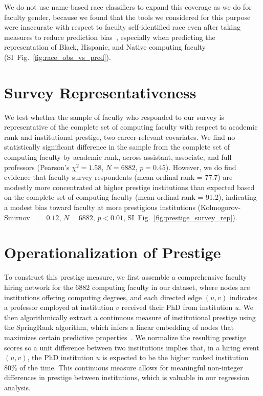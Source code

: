 \documentclass[reprint, twocolumn, aps, nofootinbib, superscriptaddress, longbibliography]{revtex4-1}
\begin{document}
We do not use name-based race classifiers to expand this coverage as we do for faculty gender, because we found that the tools we considered for this purpose were inaccurate with respect to faculty self-identified race even after taking measures to reduce prediction bias~\cite{kozlowski2021avoiding}, especially when predicting the representation of Black, Hispanic, and Native computing faculty (SI~Fig.~\ref{fig:race_obs_vs_pred}). 


\section{Survey Representativeness}\label{sec:survey_representativeness} 
We test whether the sample of faculty who responded to our survey is representative of the complete set of computing faculty with respect to academic rank and institutional prestige, two career-relevant covariates. We find no statistically significant difference in the sample from the complete set of computing faculty by academic rank, across assistant, associate, and full professors (Pearson’s $\chi^2 = 1.58$, $N = 6882$, $p = 0.45$). However, we do find evidence that faculty survey respondents (mean ordinal rank = 77.7) are modestly more concentrated at higher prestige institutions than expected based on the complete set of computing faculty (mean ordinal rank = 91.2), indicating a modest bias toward faculty at more prestigious institutions (Kolmogorov-Smirnov~$~=~0.12$, $N = 6882$, $p < 0.01$, SI~Fig.~\ref{fig:prestige_survey_rep}). 


\section{Operationalization of Prestige}\label{sec:si_prestige} 
To construct this prestige measure, we first assemble a comprehensive faculty hiring network for the 6882 computing faculty in our dataset, where nodes are institutions offering computing degrees, and each directed edge $(u,v)$ indicates a professor employed at institution $v$ received their PhD from institution $u$. We then algorithmically extract a continuous measure of institutional prestige using the SpringRank algorithm, which infers a linear embedding of nodes that maximizes certain predictive properties~\cite{de2018physical}. We normalize the resulting prestige scores so a unit difference between two institutions implies that, in a hiring event $(u,v)$, the PhD institution $u$ is expected to be the higher ranked institution 80\% of the time. This continuous measure allows for meaningful non-integer differences in prestige between institutions, which is valuable in our regression analysis. 
\end{document}

